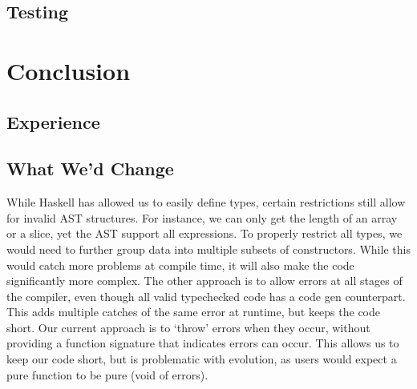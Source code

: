\documentclass[11pt]{article}
\begin{document}
\subsection{Testing}
\section{Conclusion}
\subsection{Experience}
\subsection{What We'd Change}

While Haskell has allowed us to easily define types, certain restrictions still allow for invalid AST structures. 
For instance, we can only get the length of an array or a slice, yet the AST support all expressions.
To properly restrict all types, we would need to further group data into multiple subsets of constructors.
While this would catch more problems at compile time, it will also make the code significantly more complex.
The other approach is to allow errors at all stages of the compiler, 
even though all valid typechecked code has a code gen counterpart.
This adds multiple catches of the same error at runtime, but keeps the code short.
Our current approach is to `throw' errors when they occur, without providing a function signature that indicates errors can occur.
This allows us to keep our code short, but is problematic with evolution, as users would expect a pure function to be pure (void of errors).
\end{document}
